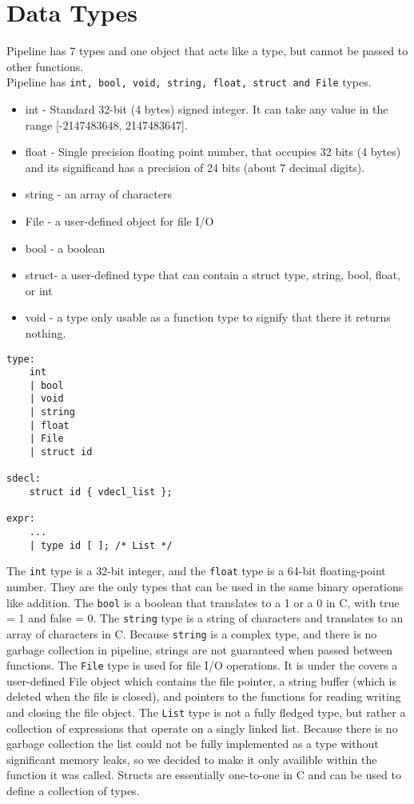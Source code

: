 \documentclass[./Report_main.tex]{subfiles}
\begin{document}
\section{Data Types}
Pipeline has 7 types and one object that acts like a type, but cannot be passed to other functions. \\
Pipeline has \texttt{int, bool, void, string, float, struct and File} types.
\begin{itemize}
    \item int -  Standard 32-bit (4 bytes) signed integer. It can take any value in the range [-2147483648, 2147483647].
    \item float - Single precision floating point number, that occupies 32 bits (4 bytes) and its significand has a precision of 24 bits (about 7 decimal digits). 
    \item string - an array of characters
    \item File - a user-defined object for file I/O
    \item bool - a boolean
    \item struct- a user-defined type that can contain a struct type, string, bool, float, or int
    \item void - a type only usable as a function type to signify that there it returns nothing.
\end{itemize}
\begin{lstlisting}
type:
    int
    | bool
    | void
    | string
    | float
    | File
    | struct id

sdecl:
    struct id { vdecl_list };

expr:
	...
	| type id [ ]; /* List */

\end{lstlisting}
The \texttt{int} type is a 32-bit integer, and the \texttt{float} type is a 64-bit floating-point number. They are the only types that can be used in the same binary operations like addition. The \texttt{bool} is a boolean that translates to a 1 or a 0 in C, with true = 1 and false = 0. The \texttt{string} type is a string of characters and translates to an array of characters in C. Because \texttt{string} is a complex type, and there is no garbage collection in pipeline, strings are not guaranteed when passed between functions. The \texttt{File} type is used for file I/O operations. It is under the covers a user-defined File object which contains the file pointer, a string buffer (which is deleted when the file is closed), and pointers to the functions for reading writing and closing the file object. The \texttt{List} type is not a fully fledged type, but rather a collection of expressions that operate on a singly linked list. Because there is no garbage collection the list could not be fully implemented as a type without significant memory leaks, so we decided to make it only availible within the function it was called. Structs are essentially one-to-one in C and can be used to define a collection of types.
\end{document}
